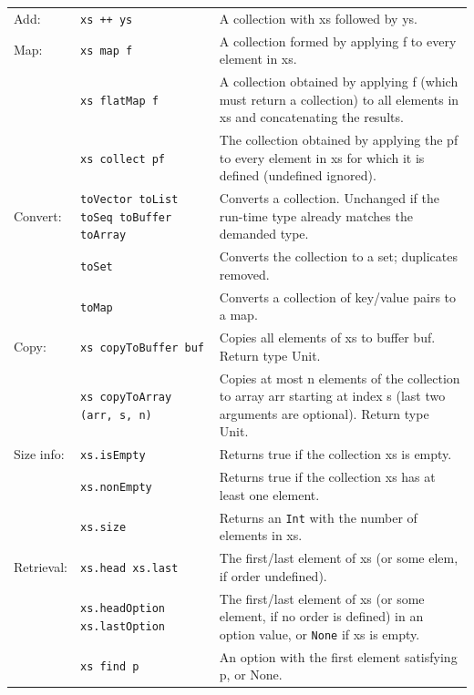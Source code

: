 \documentclass[article, a5paper]{memoir}
\begin{document}
{{\begin{tabular}{@{}l p{3.5cm} p{6.8cm}}
  Add: & \texttt{xs ++ ys} & A collection with xs followed by ys.\\\cline{1-3}
  
  Map: & \texttt{xs map f} & A collection formed by applying f to every element in xs.\\ \cline{2-3}
       & \texttt{xs flatMap f} & A collection obtained by applying f (which must return a collection) to all elements in xs and concatenating the results.\\ \cline{2-3}
       & \texttt{xs collect pf} & The collection obtained by applying the pf to every element in xs for which it is defined (undefined ignored).\\ \cline{1-3}

  Convert: & \texttt{toVector toList toSeq toBuffer toArray} & Converts a collection. Unchanged if the run-time type already matches the demanded type.\\ \cline{2-3}
   & \texttt{toSet} & Converts the collection to a set; duplicates removed.\\ \cline{2-3}
   & \texttt{toMap} & Converts a collection of key/value pairs to a map. \\ \cline{1-3}

  Copy: & \texttt{xs copyToBuffer buf } & Copies all elements of xs to buffer buf. Return type Unit.\\ \cline{2-3}
   & \texttt{xs copyToArray (arr, s, n)} & Copies at most n elements of the collection to array arr starting at index s (last two arguments are optional). Return type Unit.\\ \cline{1-3}

  Size info: & \texttt{xs.isEmpty} & Returns true if the collection xs is empty.\\ \cline{2-3}
   & \texttt{xs.nonEmpty} & Returns true if the collection xs has at least one element.\\ \cline{2-3}
   & \texttt{xs.size} & Returns an \texttt{Int} with the number of elements in xs.\\ \cline{1-3}
   

  Retrieval: & \texttt{xs.head xs.last} &  	The first/last element of xs (or some elem, if order undefined).\\ \cline{2-3}
      & \texttt{xs.headOption \newline xs.lastOption} & The first/last element of xs (or some element, if no order is defined) in an option value, or \texttt{None} if xs is empty.\\ \cline{2-3}
      & \texttt{xs find p} & An option with the first element satisfying p, or None.\\ \cline{1-3}



\end{tabular}}}
\end{document}
